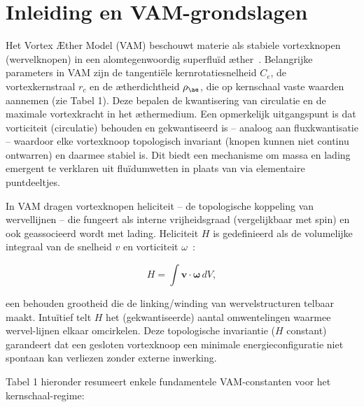 
\section{Inleiding en VAM-grondslagen}

Het Vortex Æther Model (VAM) beschouwt materie als stabiele vortexknopen (wervelknopen) in een alomtegenwoordig superfluïd æther~\cite{Kelvin1867VortexAtoms}. Belangrijke parameters in VAM zijn de tangentiële kernrotatiesnelheid $C_e$, de vortexkernstraal $r_c$ en de
ætherdichtheid $\rho_{\ae}$, die op kernschaal vaste waarden aannemen (zie Tabel 1). Deze bepalen de kwantisering van circulatie en de maximale vortexkracht in het æthermedium. Een opmerkelijk uitgangspunt is dat vorticiteit (circulatie) behouden en gekwantiseerd is – analoog aan fluxkwantisatie – waardoor elke vortexknoop topologisch invariant (knopen kunnen niet continu ontwarren) en daarmee stabiel is. Dit biedt een mechanisme om massa en lading emergent te verklaren uit fluïdumwetten in plaats van via elementaire puntdeeltjes.

In VAM dragen vortexknopen heliciteit – de topologische koppeling van wervellijnen – die fungeert als interne vrijheidsgraad (vergelijkbaar met
spin) en ook geassocieerd wordt met lading. Heliciteit $H$ is gedefinieerd als de volumelijke integraal van de snelheid $v$ en vorticiteit $\omega$~\cite{Moffatt1990VortexHelicity, Ricca1992EnergyHelicity}:


\begin{equation}
    H = \int \mathbf{v} \cdot \boldsymbol{\omega}\,dV,
\end{equation}

een behouden grootheid die de linking/winding van wervelstructuren telbaar maakt. Intuïtief telt $H$ het (gekwantiseerde) aantal omwentelingen waarmee wervel-lijnen elkaar omcirkelen. Deze topologische invariantie ($H$ constant) garandeert dat een gesloten vortexknoop een minimale energieconfiguratie niet spontaan kan verliezen zonder externe inwerking.

Tabel 1 hieronder resumeert enkele fundamentele VAM-constanten voor het kernschaal-regime:

